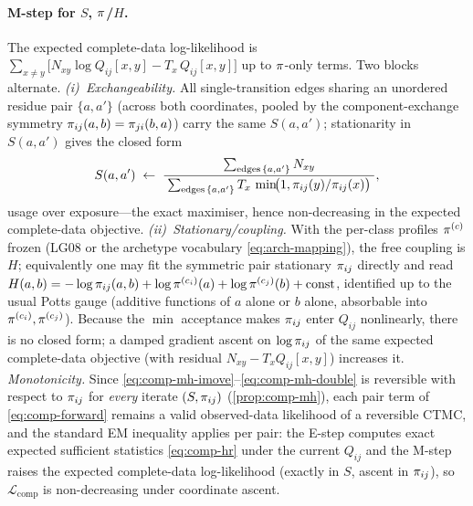 \paragraph{M-step for $S$, $\pi$/$H$.} The expected complete-data
log-likelihood is $\sum_{x\neq y}\bigl[N_{xy}\log Q_{ij}[x,y]-T_x\,
Q_{ij}[x,y]\bigr]$ up to $\pi$-only terms. Two blocks alternate.
\emph{(i)~Exchangeability.} All single-transition edges sharing an
unordered residue pair $\{a,a'\}$ (across both coordinates, pooled by the
component-exchange symmetry $\pi_{ij}(a,b)=\pi_{ji}(b,a)$) carry the same
$S(a,a')$; stationarity in $S(a,a')$ gives the closed form
\begin{equation}
  S(a,a')\;\leftarrow\;\frac{\;\sum_{\text{edges}\,\{a,a'\}}N_{xy}\;}
        {\;\sum_{\text{edges}\,\{a,a'\}}T_x\,\min\!\bigl(1,\pi_{ij}(y)/\pi_{ij}(x)\bigr)\;},
  \label{eq:comp-mstep-S}
\end{equation}
usage over exposure---the exact maximiser, hence non-decreasing in the
expected complete-data objective. \emph{(ii)~Stationary/coupling.} With the
per-class profiles $\pi^{(c)}$ frozen (LG08 or the archetype vocabulary
\eqref{eq:arch-mapping}), the free coupling is $H$; equivalently one may fit
the symmetric pair stationary $\pi_{ij}$ directly and read
$H(a,b)=-\log\pi_{ij}(a,b)+\log\pi^{(c_i)}(a)+\log\pi^{(c_j)}(b)+\text{const}$,
identified up to the usual Potts gauge (additive functions of $a$ alone or
$b$ alone, absorbable into $\pi^{(c_i)},\pi^{(c_j)}$). Because the $\min$
acceptance makes $\pi_{ij}$ enter $Q_{ij}$ nonlinearly, there is no closed
form; a damped gradient ascent on $\log\pi_{ij}$ of the same expected
complete-data objective (with residual $N_{xy}-T_xQ_{ij}[x,y]$) increases it.
\emph{Monotonicity.} Since \eqref{eq:comp-mh-imove}--\eqref{eq:comp-mh-double}
is reversible with respect to $\pi_{ij}$ for \emph{every} iterate
$(S,\pi_{ij})$ (\autoref{prop:comp-mh}), each pair term of
\eqref{eq:comp-forward} remains a valid observed-data likelihood of a
reversible CTMC, and the standard EM inequality applies per pair: the E-step
computes exact expected sufficient statistics \eqref{eq:comp-hr} under the
current $Q_{ij}$ and the M-step raises the expected complete-data
log-likelihood (exactly in $S$, ascent in $\pi_{ij}$), so
$\mathcal{L}_{\mathrm{comp}}$ is non-decreasing under coordinate ascent.

